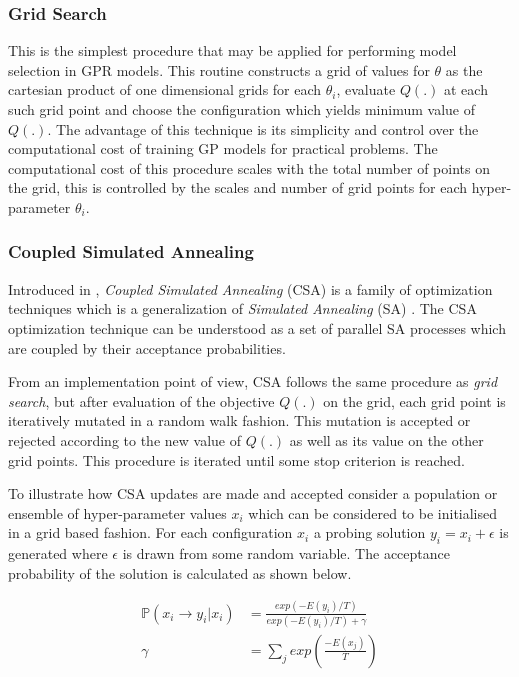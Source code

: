 \documentclass{article}
\begin{document}
\subsubsection*{Grid Search}

This is the simplest procedure that may be applied for performing model selection in GPR models. This routine constructs a grid of values for $\theta$ as the cartesian product of one dimensional grids for each $\theta_i$, evaluate $Q(.)$ at each such grid point and choose the configuration which yields minimum value of $Q(.)$. The advantage of this technique is its simplicity and control over the computational cost of training GP models for practical problems. The computational cost of this procedure scales with the total number of points on the grid, this is controlled by the scales and number of grid points for each hyper-parameter $\theta_i$.

\subsubsection*{Coupled Simulated Annealing}

Introduced in \citet{Xavier-De-Souza2010}, \emph{Coupled Simulated Annealing} (CSA) is a family of optimization techniques which is a generalization of \emph{Simulated Annealing} (SA) \citep{Kirkpatrick671}. The CSA optimization technique can be understood as a set of parallel SA processes which are coupled by their acceptance probabilities.

From an implementation point of view, CSA follows the same procedure as \emph{grid search}, but after evaluation of the objective $Q(.)$ on the grid, each grid point is iteratively mutated in a random walk fashion. This mutation is accepted or rejected according to the new value of $Q(.)$ as well as its value on the other grid points. This procedure is iterated until some stop criterion is reached.

To illustrate how CSA updates are made and accepted consider a population or ensemble of hyper-parameter values ${x_i}$ which can be considered to be initialised in a grid based fashion. For each configuration $x_i$ a probing solution $y_i = x_i + \epsilon$ is generated where $\epsilon$ is drawn from some random variable. The acceptance probability of the solution is calculated as shown below.

\begin{align*}
\mathbb{P}(x_i \rightarrow y_i | {x_i}) & = \frac{exp(-E(y_i)/T)}{exp(-E(y_i)/T) + \gamma} \\
\gamma & = \sum_{j}{exp \left ( \frac{-E(x_j)}{T} \right )}
\end{align*}
\end{document}
